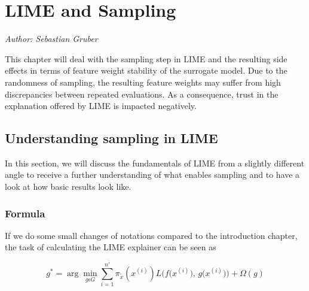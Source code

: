 \documentclass[
]{krantz}
\begin{document}
\hypertarget{lime-and-sampling}{%
\chapter{LIME and Sampling}\label{lime-and-sampling}}

\emph{Author: Sebastian Gruber}

This chapter will deal with the sampling step in LIME and the resulting side effects in terms of feature weight stability of the surrogate model.
Due to the randomness of sampling, the resulting feature weights may suffer from high discrepancies between repeated evaluations.
As a consequence, trust in the explanation offered by LIME is impacted negatively.

\hypertarget{understanding-sampling-in-lime}{%
\section{Understanding sampling in LIME}\label{understanding-sampling-in-lime}}

In this section, we will discuss the fundamentals of LIME from a slightly different angle to receive a further understanding of what enables sampling and to have a look at how basic results look like.

\hypertarget{formula}{%
\subsection{Formula}\label{formula}}

If we do some small changes of notations compared to the introduction chapter, the task of calculating the LIME explainer can be seen as

\[ g^* = \arg\min_{g \epsilon G} \sum_{i=1}^{n'} \pi_{\tilde x}(x^{(i)}) L\Big( f\big(x^{(i)}\big), \, g\big(x^{(i)}\big) \Big) + \Omega\left(g\right) \]
\end{document}

